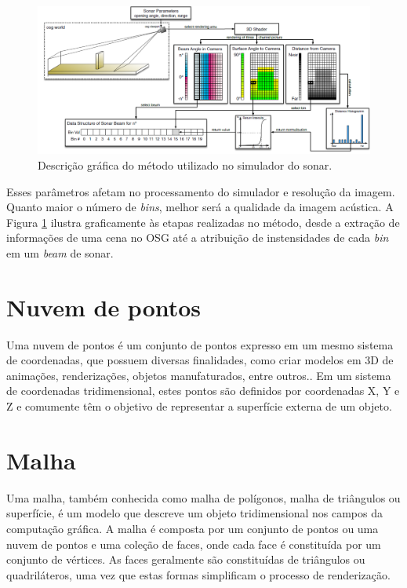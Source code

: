 \begin{figure}[H]
    \centering
    \includegraphics[scale=0.35]{dados/figuras/gpu_sonar.png}
    \caption{Descrição gráfica do método utilizado no simulador do sonar.}
    \vspace{-0.8em}
    \label{fig:gpu_sonar_sim}
\end{figure}

Esses parâmetros afetam no processamento do simulador e resolução da imagem. Quanto maior o número de \textit{bins}, melhor será a qualidade da imagem acústica. A Figura \ref{fig:gpu_sonar_sim} ilustra graficamente às etapas realizadas no método, desde a extração de informações de uma cena no OSG até a atribuição de instensidades de cada \textit{bin} em um \textit{beam} de sonar.

\section{Nuvem de pontos}
\label{sec:point_cloud}
Uma nuvem de pontos é um conjunto de pontos expresso em um mesmo sistema de coordenadas, que possuem diversas finalidades, como criar modelos em 3D de animações, renderizações, objetos manufaturados, entre outros.. 
Em um sistema de coordenadas tridimensional, estes pontos são definidos por coordenadas X, Y e Z e comumente têm o objetivo de representar a superfície externa de um objeto.

\iffalse
\section{Malha}
\label{sec:mesh}
Uma malha, também conhecida como malha de polígonos, malha de triângulos ou superfície, é um modelo que descreve um objeto tridimensional nos campos da computação gráfica. 
A malha é composta por um conjunto de pontos ou uma nuvem de pontos e uma coleção de faces, onde cada face é constituída por um conjunto de vértices. 
As faces geralmente são constituídas de triângulos ou quadriláteros, uma vez que estas formas simplificam o processo de renderização.


